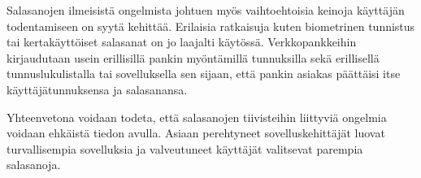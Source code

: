 Salasanojen ilmeisistä ongelmista johtuen myös vaihtoehtoisia keinoja käyttäjän todentamiseen on syytä kehittää. Erilaisia ratkaisuja kuten biometrinen tunnistus tai kertakäyttöiset salasanat on jo laajalti käytössä. Verkkopankkeihin kirjaudutaan usein erillisillä pankin myöntämillä tunnuksilla sekä erillisellä tunnuslukulistalla tai sovelluksella sen sijaan, että pankin asiakas päättäisi itse käyttäjätunnuksensa ja salasanansa.

Yhteenvetona voidaan todeta, että salasanojen tiivisteihin liittyviä ongelmia voidaan ehkäistä tiedon avulla. Asiaan perehtyneet sovelluskehittäjät luovat turvallisempia sovelluksia ja valveutuneet käyttäjät valitsevat parempia salasanoja.
